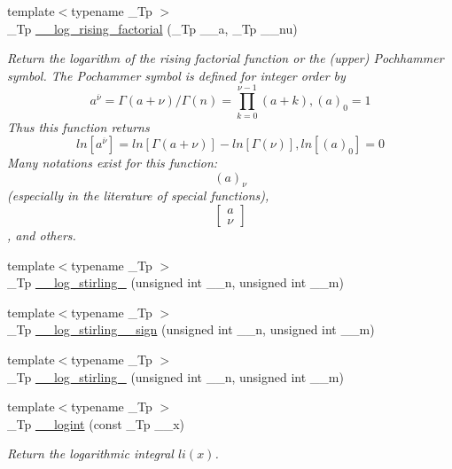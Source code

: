 \begin{DoxyCompactItemize}
\item 
{\footnotesize template$<$typename \+\_\+\+Tp $>$ }\\\+\_\+\+Tp \hyperlink{namespacestd_1_1____detail_a48998bae6619c9f63574af354b205074}{\+\_\+\+\_\+log\+\_\+rising\+\_\+factorial} (\+\_\+\+Tp \+\_\+\+\_\+a, \+\_\+\+Tp \+\_\+\+\_\+nu)
\begin{DoxyCompactList}\small\item\em Return the logarithm of the rising factorial function or the (upper) Pochhammer symbol. The Pochammer symbol is defined for integer order by \[ a^{\overline{\nu}} = \Gamma(a + \nu) / \Gamma(n) = \prod_{k=0}^{\nu-1} (a + k), (a)_0 = 1 \] Thus this function returns \[ ln[a^{\overline{\nu}}] = ln[\Gamma(a + \nu)] - ln[\Gamma(\nu)], ln[(a)_0] = 0 \] Many notations exist for this function\+: \[ (a)_\nu \] (especially in the literature of special functions), \[ \left[ \begin{array}{c} a \\ \nu \end{array} \right] \], and others. \end{DoxyCompactList}\item 
{\footnotesize template$<$typename \+\_\+\+Tp $>$ }\\\+\_\+\+Tp \hyperlink{namespacestd_1_1____detail_a4924c5c0666c33328d6276b5dbbdfad5}{\+\_\+\+\_\+log\+\_\+stirling\+\_} (unsigned int \+\_\+\+\_\+n, unsigned int \+\_\+\+\_\+m)
\item 
{\footnotesize template$<$typename \+\_\+\+Tp $>$ }\\\+\_\+\+Tp \hyperlink{namespacestd_1_1____detail_af804ed0eecfca835d1338a48892460b0}{\+\_\+\+\_\+log\+\_\+stirling\+\_\+\_\+sign} (unsigned int \+\_\+\+\_\+n, unsigned int \+\_\+\+\_\+m)
\item 
{\footnotesize template$<$typename \+\_\+\+Tp $>$ }\\\+\_\+\+Tp \hyperlink{namespacestd_1_1____detail_a7ba1fde0547236676d579b6405f2fb25}{\+\_\+\+\_\+log\+\_\+stirling\+\_} (unsigned int \+\_\+\+\_\+n, unsigned int \+\_\+\+\_\+m)
\item 
{\footnotesize template$<$typename \+\_\+\+Tp $>$ }\\\+\_\+\+Tp \hyperlink{namespacestd_1_1____detail_a4d5f8cb2b4e6e192faba9418ec14149f}{\+\_\+\+\_\+logint} (const \+\_\+\+Tp \+\_\+\+\_\+x)
\begin{DoxyCompactList}\small\item\em Return the logarithmic integral $ li(x) $. \end{DoxyCompactList}\item 

\end{DoxyCompactItemize}
